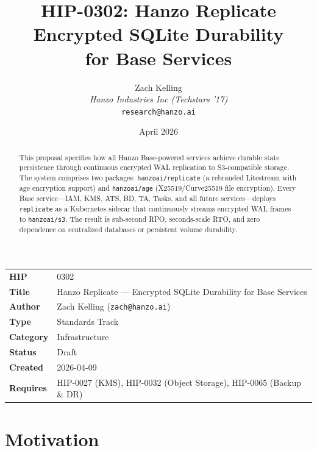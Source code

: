 \documentclass[11pt]{article}
\title{HIP-0302: Hanzo Replicate\\[0.3em]
{\large Encrypted SQLite Durability\\for Base Services}}
\author{
    Zach Kelling \\
    \textit{Hanzo Industries Inc (Techstars '17)} \\
    \texttt{research@hanzo.ai}
}
\date{April 2026}
\begin{document}
\hanzocoverpage

\noindent
\begin{tabular}{@{}ll}
\textbf{HIP}      & 0302 \\
\textbf{Title}    & Hanzo Replicate --- Encrypted SQLite Durability for Base Services \\
\textbf{Author}   & Zach Kelling (\texttt{zach@hanzo.ai}) \\
\textbf{Type}     & Standards Track \\
\textbf{Category} & Infrastructure \\
\textbf{Status}   & Draft \\
\textbf{Created}  & 2026-04-09 \\
\textbf{Requires} & HIP-0027 (KMS), HIP-0032 (Object Storage), HIP-0065 (Backup \& DR) \\
\end{tabular}

\vspace{1em}

\begin{abstract}
This proposal specifies how all Hanzo Base-powered services achieve durable
state persistence through continuous encrypted WAL replication to
S3-compatible storage. The system comprises two packages:
\texttt{hanzoai/replicate} (a rebranded Litestream with age encryption
support) and \texttt{hanzoai/age} (X25519/Curve25519 file encryption). Every
Base service---IAM, KMS, ATS, BD, TA, Tasks, and all future
services---deploys \texttt{replicate} as a Kubernetes sidecar that
continuously streams encrypted WAL frames to \texttt{hanzoai/s3}. The result
is sub-second RPO, seconds-scale RTO, and zero dependence on centralized
databases or persistent volume durability.
\end{abstract}

\section{Motivation}
\end{document}
